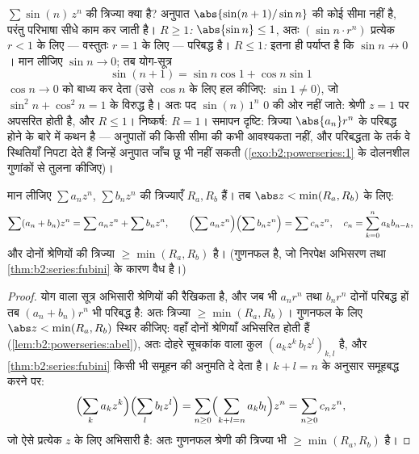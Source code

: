 \begin{example}[बिना अनुपात जाँच के एक त्रिज्या]\label{ex:b2:powerseries:sinn}
$\sum \sin(n)\,z^n$ की त्रिज्या क्या है? अनुपात $\abs{\sin(n+1)/\sin n}$ की कोई सीमा नहीं है, परंतु परिभाषा
सीधे काम कर जाती है। \emph{$R \geq 1$:} $\abs{\sin n} \leq 1$, अतः $(\sin
n\cdot r^n)$ प्रत्येक $r < 1$ के लिए ---
वस्तुतः $r =
1$ के लिए --- परिबद्ध है। \emph{$R \leq 1$:} इतना ही पर्याप्त है कि
$\sin n \not\to 0$। मान लीजिए $\sin n \to 0$; तब योग-सूत्र
\[
\sin(n+1) = \sin n\cos 1 + \cos n\sin 1
\]
$\cos n \to 0$ को बाध्य कर देता (उसे $\cos n$ के लिए हल कीजिए: $\sin 1 \neq
0$), जो $\sin^2 n + \cos^2 n = 1$ के विरुद्ध
है। अतः पद $\sin(n)\,1^n$ $0$ की ओर नहीं जाते: श्रेणी $z =
1$ पर अपसरित होती है, और
$R \leq 1$। निष्कर्ष: $R = 1$। समापन दृष्टि: त्रिज्या $\abs{a_n}r^n$ के परिबद्ध होने के बारे
में कथन है --- अनुपातों की किसी सीमा की कभी आवश्यकता नहीं, और परिबद्धता के
तर्क वे स्थितियाँ निपटा देते हैं जिन्हें अनुपात जाँच छू भी नहीं सकती (\cref{exo:b2:powerseries:1}
के दोलनशील गुणांकों से तुलना कीजिए)।
\end{example}

\begin{proposition}[संक्रियाएँ]\label{prop:b2:powerseries:operations}
मान लीजिए $\sum a_nz^n$, $\sum b_nz^n$ की त्रिज्याएँ $R_a, R_b$ हैं। तब $\abs z < \min(R_a, R_b)$ के लिए:
\[
\sum (a_n + b_n)z^n = \sum a_nz^n + \sum b_nz^n,
\qquad
\Bigl(\sum a_nz^n\Bigr)\Bigl(\sum b_nz^n\Bigr) = \sum c_n z^n,
\quad c_n = \sum_{k=0}^{n} a_kb_{n-k},
\]
और दोनों श्रेणियों की त्रिज्या $\geq \min(R_a, R_b)$ है। (गुणनफल  है, जो
निरपेक्ष अभिसरण तथा \cref{thm:b2:series:fubini} के कारण वैध है।)
\end{proposition}

\begin{proof}
योग वाला सूत्र अभिसारी श्रेणियों की रैखिकता है, और जब भी $a_nr^n$ तथा $b_nr^n$
दोनों परिबद्ध हों तब $(a_n + b_n)r^n$ भी परिबद्ध है: अतः त्रिज्या $\geq \min(R_a, R_b)$। गुणनफल के लिए
$\abs z
< \min(R_a, R_b)$ स्थिर कीजिए: वहाँ दोनों श्रेणियाँ \emph{} अभिसरित होती
हैं (\cref{lem:b2:powerseries:abel}), अतः दोहरे सूचकांक वाला कुल $(a_kz^k\,b_lz^l)_{k,l}$  है, और \cref{thm:b2:series:fubini} किसी भी समूहन
की अनुमति दे देता है। $k
+ l = n$ के अनुसार समूहबद्ध करने पर:
\[
\Bigl(\sum_k a_kz^k\Bigr)\Bigl(\sum_l b_lz^l\Bigr)
= \sum_{n\geq0}\Bigl(\sum_{k+l=n}a_kb_l\Bigr)z^n
= \sum_{n\geq0}c_nz^n ,
\]
जो ऐसे प्रत्येक $z$ के लिए  अभिसारी है: अतः गुणनफल श्रेणी
की त्रिज्या भी $\geq \min(R_a, R_b)$ है।
\end{proof}

